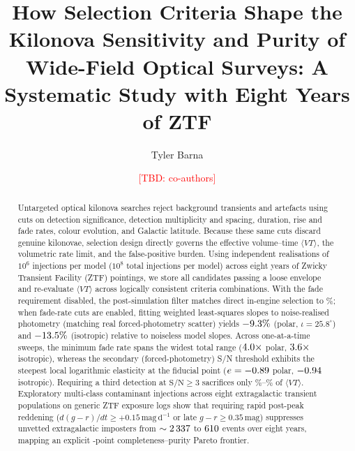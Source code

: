 \documentclass[twocolumn]{aastex631}
\newcommand{\tbd}[1]{\textcolor{red}{[TBD: #1]}}
\newcommand{\vteff}{\langle VT\rangle}
\begin{document}
\title{How Selection Criteria Shape the Kilonova Sensitivity and Purity of Wide-Field Optical Surveys: A Systematic Study with Eight Years of ZTF}

\author[0000-0002-0000-0000]{Tyler Barna}

\author{\tbd{co-authors}}

\begin{abstract}
Untargeted optical kilonova searches reject background transients and artefacts using cuts on detection significance, detection multiplicity and spacing, duration, rise and fade rates, colour evolution, and Galactic latitude. Because these same cuts discard genuine kilonovae, selection design directly governs the effective volume--time $\vteff$, the volumetric rate limit, and the false-positive burden. Using \SuiteTwoSamplesPerModel{} independent realisations of $10^6$ injections per model ($10^8$ total injections per model) across eight years of Zwicky Transient Facility (ZTF) pointings, we store all candidates passing a loose envelope and re-evaluate $\vteff$ across \GridPointsTotal{} logically consistent criteria combinations. With the fade requirement disabled, the post-simulation filter matches direct in-engine selection to \NoFadeFilterMinusEnginePct{}\%; when fade-rate cuts are enabled, fitting weighted least-squares slopes to noise-realised photometry (matching real forced-photometry scatter) yields $-9.3{}\%$ (polar, $\iota = 25.8^\circ$) and $-13.5{}\%$ (isotropic) relative to noiseless model slopes. Across one-at-a-time sweeps, the minimum fade rate spans the widest total range ($4.0{}\times$ polar, $3.6{}\times$ isotropic), whereas the secondary (forced-photometry) S/N threshold exhibits the steepest local logarithmic elasticity at the fiducial point ($e = -0.89{}$ polar, $-0.94{}$ isotropic). Requiring a third detection at $\mathrm{S/N} \ge 3$ sacrifices only \NminThreeVTLossPolarPct{}\%--\NminThreeVTLossIsoPct{}\% of $\vteff$. Exploratory multi-class contaminant injections across eight extragalactic transient populations on generic ZTF exposure logs show that requiring rapid post-peak reddening ($d(g-r)/dt \ge +0.15\,\mathrm{mag\,d}^{-1}$ or late $g-r \ge 0.35\,\mathrm{mag}$) suppresses unvetted extragalactic imposters from $\sim 2\,337{}$ to $610{}$ events over eight years, mapping an explicit \ParetoPointCount{}-point completeness--purity Pareto frontier.
\end{abstract}
\end{document}
